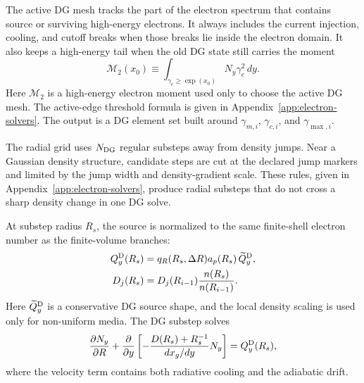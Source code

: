 \documentclass[twocolumn]{aastex702}
\begin{document}
The active DG mesh tracks the part of the electron spectrum that contains source
or surviving high-energy electrons.  It always includes the current injection,
cooling, and cutoff breaks when those breaks lie inside the electron domain.  It
also keeps a high-energy tail when the old DG state still carries the moment
\begin{equation}
\mathcal{M}_2(x_0)\equiv
\int_{\gamma_e\ge\exp(x_0)}N_y\gamma_e^2\,dy .
\end{equation}
Here \(\mathcal{M}_2\) is a high-energy electron moment used only to choose the
active DG mesh.  The active-edge threshold formula is given in
Appendix~\ref{app:electron-solvers}.  The output is a DG element set built around
\(\gamma_{m,i}\), \(\gamma_{c,i}\), and \(\gamma_{\max,i}\).

The radial grid uses \(N_{\rm DG}\) regular substeps away from density jumps.
Near a Gaussian density structure, candidate steps are cut at the declared jump
markers and limited by the jump width and density-gradient scale.  These rules,
given in Appendix~\ref{app:electron-solvers}, produce radial substeps that do
not cross a sharp density change in one DG solve.

At substep radius \(R_s\), the source is normalized to the same finite-shell
electron number as the finite-volume branches:
\begin{equation}
\begin{aligned}
Q_y^{\rm D}(R_s)&=
q_R(R_s,\Delta R)a_p(R_s)\,\widetilde Q_y^{\rm D},\\
D_j(R_s)&=
D_j(R_{i-1})\frac{n(R_s)}{n(R_{i-1})}.
\end{aligned}
\end{equation}
Here \(\widetilde Q_y^{\rm D}\) is a conservative DG source shape, and the local
density scaling is used only for non-uniform media.  The DG substep solves
\begin{equation}
\begin{aligned}
\frac{\partial N_y}{\partial R}
+\frac{\partial}{\partial y}
\left[
-\frac{D(R_s)+R_s^{-1}}
{dx_g/dy}N_y
\right]
=Q_y^{\rm D}(R_s),
\end{aligned}
\end{equation}
where the velocity term contains both radiative cooling and the adiabatic drift.
\end{document}
